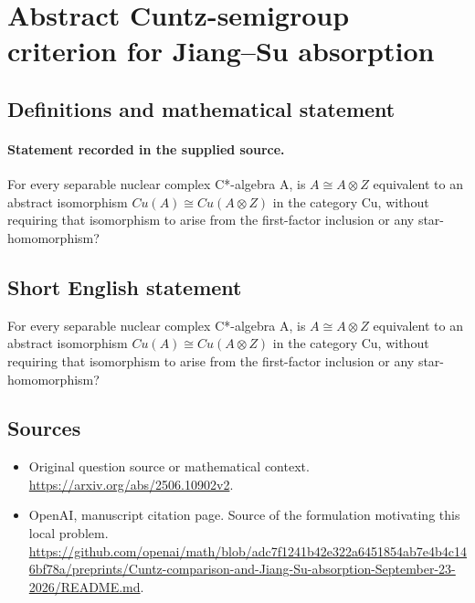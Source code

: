 \documentclass[11pt]{article}
\begin{document}
\section*{Abstract Cuntz-semigroup criterion for Jiang–Su absorption}\label{30007294}
\subsection{Definitions and mathematical statement}
\paragraph{Statement recorded in the supplied source.}
For every separable nuclear complex C*-algebra A, is $A\cong A\otimes Z$ equivalent to an abstract isomorphism $Cu(A)\cong Cu(A\otimes Z)$ in the category Cu, without requiring that isomorphism to arise from the first-factor inclusion or any star-homomorphism?
\subsection{Short English statement}
For every separable nuclear complex C*-algebra A, is $A\cong A\otimes Z$ equivalent to an abstract isomorphism $Cu(A)\cong Cu(A\otimes Z)$ in the category Cu, without requiring that isomorphism to arise from the first-factor inclusion or any star-homomorphism?
\subsection{Sources}
\begin{itemize}
\item[S1] Original question source or mathematical context.
\url{https://arxiv.org/abs/2506.10902v2}.
\item[S2] OpenAI, manuscript citation page. Source of the formulation motivating this local problem.
\url{https://github.com/openai/math/blob/adc7f1241b42e322a6451854ab7e4b4c146bf78a/preprints/Cuntz-comparison-and-Jiang-Su-absorption-September-23-2026/README.md}.
\end{itemize}
\end{document}

